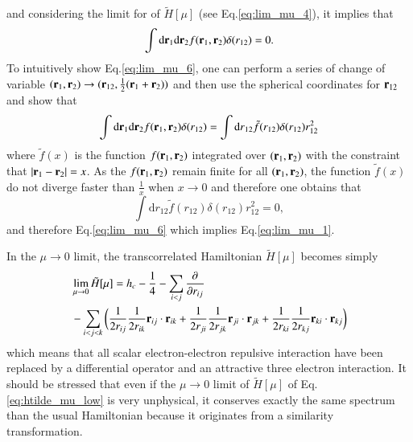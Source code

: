 \documentclass[aip,jcp,reprint,noshowkeys,superscriptaddress]{revtex4-1}
\newcommand{\deriv}[3]{\frac{\partial^{#3} #1}{\partial {#2}^{#3}}}
\newcommand{\br}[0]{{\bf {r}}}
\newcommand{\bri}[1]{{\bf r}_{#1}}
\begin{document}
and considering the limit for of $\tilde{H}[\mu]$ (see Eq.\eqref{eq:lim_mu_4}), it implies that 
\begin{equation}
 \label{eq:lim_mu_6}
 \int \text{d}\br{}_1 \text{d}\br{}_2 f(\br{}_1,\br{}_2) \delta(r_{12}) = 0.
\end{equation}
To intuitively show Eq.\eqref{eq:lim_mu_6}, one can perform a series of change of variable $(\br{}_1,\br{}_2)\rightarrow (\br{}_{12},\frac{1}{2}(\br{}_1 + \br{}_2))$ and then use the spherical coordinates for $\br{}_{12}$ and show that 
\begin{equation}
 \int \text{d}\br{}_1 \text{d}\br{}_2 f(\br{}_1,\br{}_2) \delta(r_{12}) = \int \text{d}r{}_{12}  \tilde{f}(r_{12}) \delta(r_{12}) r_{12}^2 
\end{equation}
where $\tilde{f}(x)$ is the function $f(\br{}_1,\br{}_2)$ integrated over $(\br{}_1,\br{}_2)$ with the constraint that 
$|\br{}_1-\br{}_2| = x$. 
As the $f(\br{}_1,\br{}_2)$ remain finite for all $(\br{}_1,\br{}_2)$, the function $\tilde{f}(x)$ 
do not diverge faster than $\frac{1}{x}$ when $x\rightarrow 0$ and therefore one obtains that 
\begin{equation}
 \int \text{d}r{}_{12}  \tilde{f}(r_{12}) \delta(r_{12}) r_{12}^2 = 0,
\end{equation}
and therefore Eq.\eqref{eq:lim_mu_6} which implies Eq.\eqref{eq:lim_mu_1}. 

In the $\mu \rightarrow 0$ limit, the transcorrelated Hamiltonian $\tilde{H}[\mu]$ becomes simply 
\begin{equation}
 \label{eq:htilde_mu_low}
 \begin{aligned}
&\lim_{\mu \rightarrow 0} \tilde{H}[\mu] = h_c - \frac{1}{4} - \sum_{i<j}\deriv{}{r_{ij}}{} \\
 & - \sum_{i<j<k}  \bigg(\frac{1}{2 r_{ij}} \frac{1}{2 r_{ik}} \bri{ij} \cdot \bri{ik} + \frac{1}{2 r_{ji}} \frac{1}{2 r_{jk}} \bri{ji} \cdot \bri{jk}  + \frac{1}{2 r_{ki}} \frac{1}{2 r_{kj}} \bri{ki} \cdot \bri{kj} \bigg)
 \end{aligned}
\end{equation}
which means that all scalar electron-electron repulsive interaction have been replaced by a differential operator and an attractive three electron interaction. 
It should be stressed that even if the $\mu \rightarrow 0$ limit of $\tilde{H}[\mu]$ of Eq. \eqref{eq:htilde_mu_low} is very unphysical, it conserves exactly the same spectrum than the usual Hamiltonian because it originates from a similarity transformation. 
\end{document}
